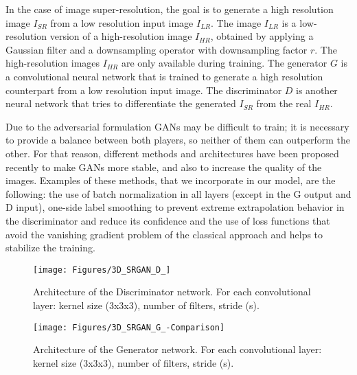 \documentclass{article}
\begin{document}
In the case of image super-resolution, the goal is to generate a high resolution image $I_{SR}$ from a low resolution input image $I_{LR}$. The image $I_{LR}$ is a low-resolution version of a high-resolution image $I_{HR}$, obtained by applying a Gaussian filter and a downsampling operator with downsampling factor $r$. The high-resolution images $I_{HR}$ are only available during training.
The generator $G$ is a convolutional neural network that is trained to generate a high resolution counterpart from a low resolution input image. The discriminator $D$ is another neural network that tries to differentiate the generated $I_{SR}$ from the real $I_{HR}$.

Due to the adversarial formulation GANs may be difficult to train; it is necessary to provide a balance between both players, so neither of them can outperform the other.
For that reason, different methods and architectures have been proposed recently to make GANs more stable, and also to increase the quality of the images.
Examples of these methods, that we incorporate in our model, are the following:
the use of batch normalization in all layers (except in the G output and D input), one-side label smoothing to prevent extreme extrapolation behavior in the discriminator and reduce its confidence and the use of loss functions that avoid the vanishing gradient problem of the classical approach and helps to stabilize the training.

\begin{figure*}
  \texttt{[image: Figures/3D\_SRGAN\_D\_]}
  \caption{Architecture of the Discriminator network. For each convolutional layer: kernel size (3x3x3), number of filters, stride (s).}
  \label{fig:D}
\end{figure*}
\begin{figure*}
   \texttt{[image: Figures/3D\_SRGAN\_G\_-Comparison]}
   \caption{Architecture of the Generator network. For each convolutional layer: kernel size (3x3x3), number of filters, stride (s).}
	\label{fig:G}
\end{figure*}
\end{document}
